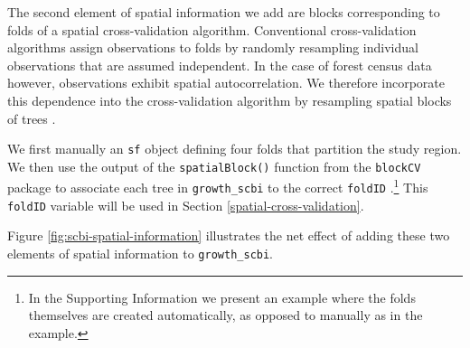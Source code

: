 \documentclass[12pt]{article}
\newenvironment{Shaded}{\begin{snugshade}}{\end{snugshade}}
\newcommand{\CommentTok}[1]{\textcolor[rgb]{0.56,0.35,0.01}{\textit{#1}}}
\newcommand{\DataTypeTok}[1]{\textcolor[rgb]{0.13,0.29,0.53}{#1}}
\newcommand{\DecValTok}[1]{\textcolor[rgb]{0.00,0.00,0.81}{#1}}
\newcommand{\FloatTok}[1]{\textcolor[rgb]{0.00,0.00,0.81}{#1}}
\newcommand{\KeywordTok}[1]{\textcolor[rgb]{0.13,0.29,0.53}{\textbf{#1}}}
\newcommand{\NormalTok}[1]{#1}
\newcommand{\OperatorTok}[1]{\textcolor[rgb]{0.81,0.36,0.00}{\textbf{#1}}}
\newcommand{\StringTok}[1]{\textcolor[rgb]{0.31,0.60,0.02}{#1}}
\begin{document}
\begin{Shaded}
\end{Shaded}

The second element of spatial information we add are blocks
corresponding to folds of a spatial cross-validation algorithm.
Conventional cross-validation algorithms assign observations to folds by
randomly resampling individual observations that are assumed
independent. In the case of forest census data however, observations
exhibit spatial autocorrelation. We therefore incorporate this
dependence into the cross-validation algorithm by resampling spatial
blocks of trees \citep[
\citet{pohjankukka_estimating_2017}]{roberts_cross-validation_2017}.

We first manually an \texttt{sf} object defining four folds that
partition the study region. We then use the output of the
\texttt{spatialBlock()} function from the \texttt{blockCV} package to
associate each tree in \texttt{growth\_scbi} to the correct
\texttt{foldID} \citep{valavi_blockcv_2019}.\footnote{In the Supporting
  Information we present an example where the folds themselves are
  created automatically, as opposed to manually as in the example.} This
\texttt{foldID} variable will be used in Section
\ref{spatial-cross-validation}.

Figure \ref{fig:scbi-spatial-information} illustrates the net effect of
adding these two elements of spatial information to
\texttt{growth\_scbi}.
\end{document}
